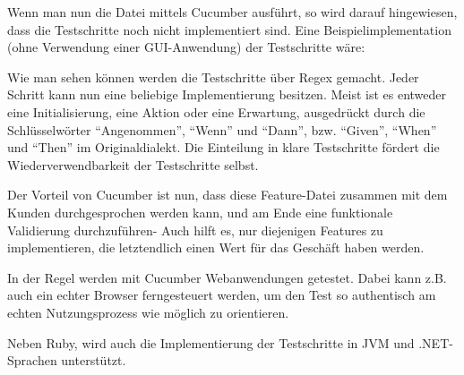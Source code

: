 

Wenn man nun die Datei mittels Cucumber ausführt, so wird darauf hingewiesen, dass die Testschritte noch nicht implementiert sind.
Eine Beispielimplementation (ohne Verwendung einer GUI-Anwendung) der Testschritte wäre:



Wie man sehen können werden die Testschritte über Regex gemacht. Jeder Schritt kann nun eine beliebige Implementierung besitzen. Meist ist es entweder eine Initialisierung, eine Aktion oder eine Erwartung, ausgedrückt durch die Schlüsselwörter "`Angenommen"', "`Wenn"' und "`Dann"', bzw. "`Given"', "`When"' und "`Then"' im Originaldialekt. Die Einteilung in klare Testschritte fördert die Wiederverwendbarkeit der Testschritte selbst.

Der Vorteil von Cucumber ist nun, dass diese Feature-Datei zusammen mit dem Kunden durchgesprochen werden kann, und am Ende eine funktionale Validierung durchzuführen- Auch hilft es, nur diejenigen Features zu implementieren, die letztendlich einen Wert für das Geschäft haben werden. 
 
In der Regel werden mit Cucumber Webanwendungen getestet. Dabei kann z.B. auch ein echter Browser ferngesteuert werden, um den Test so authentisch am echten Nutzungsprozess wie möglich zu orientieren. 

Neben Ruby, wird auch die Implementierung der Testschritte in JVM und .NET-Sprachen unterstützt.